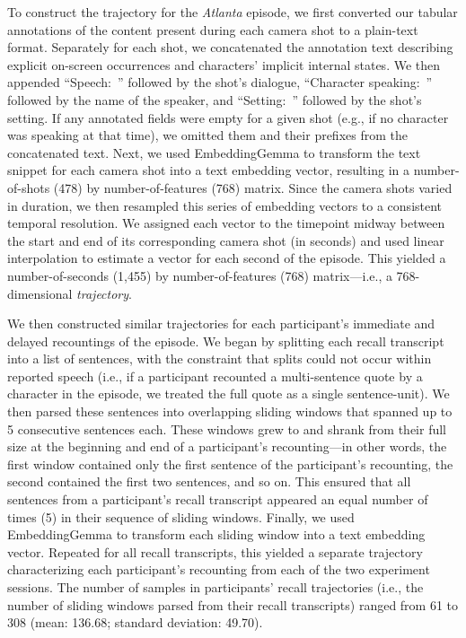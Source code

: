 \documentclass[10pt]{article}
\begin{document}
To construct the trajectory for the \textit{Atlanta} episode, we first converted our tabular annotations of the content present during each camera shot to a plain-text format.
Separately for each shot, we concatenated the annotation text describing explicit on-screen occurrences and characters' implicit internal states.
We then appended ``Speech:~'' followed by the shot's dialogue, ``Character speaking:~'' followed by the name of the speaker, and ``Setting:~'' followed by the shot's setting.
If any annotated fields were empty for a given shot (e.g., if no character was speaking at that time), we omitted them and their prefixes from the concatenated text.
Next, we used EmbeddingGemma to transform the text snippet for each camera shot into a text embedding vector, resulting in a number-of-shots (478) by number-of-features (768) matrix.
Since the camera shots varied in duration, we then resampled this series of embedding vectors to a consistent temporal resolution.
We assigned each vector to the timepoint midway between the start and end of its corresponding camera shot (in seconds) and used linear interpolation to estimate a vector for each second of the episode.
This yielded a number-of-seconds (1,455) by number-of-features (768) matrix---i.e., a 768-dimensional \textit{trajectory}.

We then constructed similar trajectories for each participant's immediate and delayed recountings of the episode.
We began by splitting each recall transcript into a list of sentences, with the constraint that splits could not occur within reported speech (i.e., if a participant recounted a multi-sentence quote by a character in the episode, we treated the full quote as a single sentence-unit).
We then parsed these sentences into overlapping sliding windows that spanned up to 5 consecutive sentences each.
These windows grew to and shrank from their full size at the beginning and end of a participant's recounting---in other words, the first window contained only the first sentence of the participant's recounting, the second contained the first two sentences, and so on.
This ensured that all sentences from a participant's recall transcript appeared an equal number of times (5) in their sequence of sliding windows.
Finally, we used EmbeddingGemma to transform each sliding window into a text embedding vector.
Repeated for all recall transcripts, this yielded a separate trajectory characterizing each participant's recounting from each of the two experiment sessions. The number of samples in participants' recall trajectories (i.e., the number of sliding windows parsed from their recall transcripts) ranged from 61 to 308 (mean: 136.68; standard deviation: 49.70).
\end{document}
